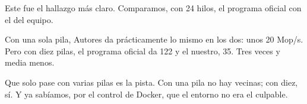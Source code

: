 Este fue el hallazgo más claro. Comparamos, con 24 hilos, el programa oficial con el del equipo.

Con una sola pila, Autores da prácticamente lo mismo en los dos: unos 20 Mop/s. Pero con diez pilas, el programa oficial da 122 y el nuestro, 35. Tres veces y media menos.

Que solo pase con varias pilas es la pista. Con una pila no hay vecinas; con diez, sí. Y ya sabíamos, por el control de Docker, que el entorno no era el culpable.
